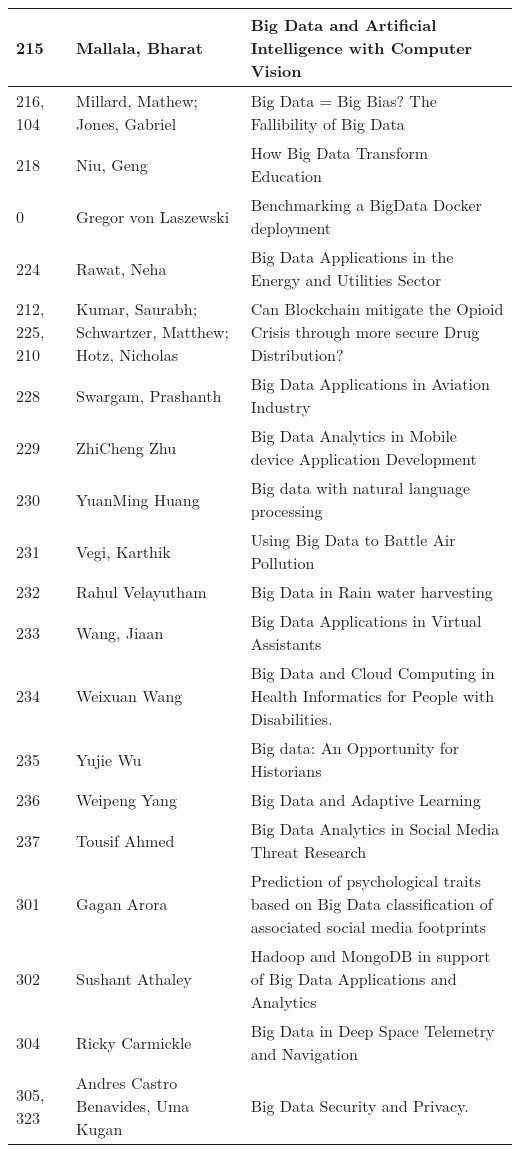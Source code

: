 \documentclass[12pt]{book}
\begin{document}
\begin{footnotesize}
\begin{longtable}{|p{1cm}p{5cm}p{9cm}|}
\hline
215 & Mallala, Bharat & Big Data and Artificial Intelligence with Computer Vision  \\
\hline
216, 104 & Millard, Mathew; Jones, Gabriel & Big Data = Big Bias? The Fallibility of Big Data  \\
\hline
218 & Niu, Geng & How Big Data Transform Education  \\
\hline
0 & Gregor von Laszewski & Benchmarking a BigData Docker deployment  \\
\hline
224 & Rawat, Neha & Big Data Applications in the Energy and Utilities Sector  \\
\hline
212, 225, 210 & Kumar, Saurabh; Schwartzer, Matthew; Hotz, Nicholas & Can Blockchain mitigate the Opioid Crisis through more secure Drug Distribution?  \\
\hline
228 & Swargam, Prashanth & Big Data Applications in Aviation Industry  \\
\hline
229 & ZhiCheng Zhu & Big Data Analytics in Mobile device Application Development  \\
\hline
230 & YuanMing Huang & Big data with natural language processing  \\
\hline
231 & Vegi, Karthik & Using Big Data to Battle Air Pollution  \\
\hline
232 & Rahul Velayutham & Big Data in Rain water harvesting  \\
\hline
233 & Wang, Jiaan & Big Data Applications in Virtual Assistants  \\
\hline
234 & Weixuan Wang & Big Data and Cloud Computing in Health Informatics for People with Disabilities.  \\
\hline
235 & Yujie Wu & Big data: An Opportunity for Historians  \\
\hline
236 & Weipeng Yang & Big Data and Adaptive Learning  \\
\hline
237 & Tousif Ahmed & Big Data Analytics in Social Media Threat Research  \\
\hline
301 & Gagan Arora & Prediction of psychological traits based on Big Data classification of associated social media footprints  \\
\hline
302 & Sushant Athaley & Hadoop and MongoDB in support of Big Data Applications and Analytics  \\
\hline
304 & Ricky Carmickle & Big Data in Deep Space Telemetry and Navigation  \\
\hline
305, 323 & Andres Castro Benavides, Uma Kugan & Big Data Security and Privacy.  \\
\hline

\end{longtable}
\end{footnotesize}
\end{document}
